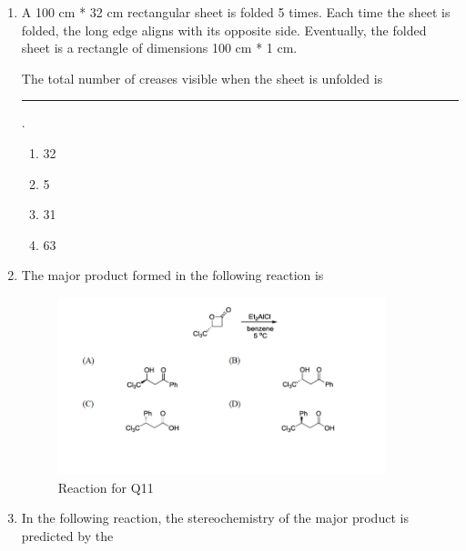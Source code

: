 \documentclass[journal,12pt,onecolumn]{IEEEtran}
\theoremstyle{remark}
\begin{document}
\begin{enumerate}
\item A 100 cm * 32 cm rectangular sheet is folded 5 times. Each time the sheet is folded, the long edge aligns with its opposite side. Eventually, the folded sheet is a rectangle of dimensions 100 cm * 1 cm.

The total number of creases visible when the sheet is unfolded is \rule{1cm}{0.15mm}. \hfill{}

\begin{multicols}{2}
\begin{enumerate}
\item 32
\item 5
\item 31
\item 63
\end{enumerate}
\end{multicols}













\item The major product formed in the following reaction is \hfill{}

\begin{figure}[h!]
    \centering
    \includegraphics[width=0.9\textwidth]{figs/image5.png}
    \caption{Reaction for Q11}
    \label{fig:q11reaction}
\end{figure}

\newpage

\item In the following reaction, the stereochemistry of the major product is predicted by the \hfill{}


\end{enumerate}
\end{document}
